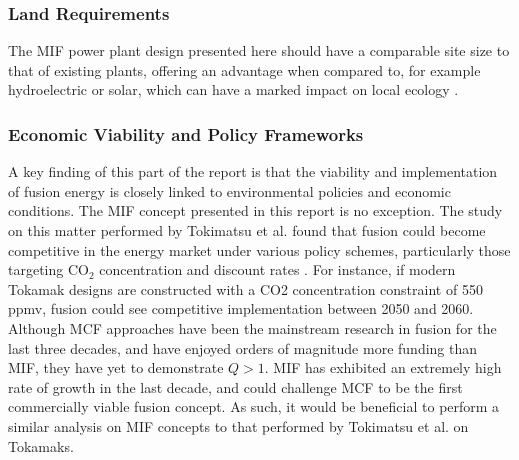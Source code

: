 \subsubsection{Land Requirements}
The MIF power plant design presented here should have a comparable site size to that of existing plants, offering an advantage when compared to, for example hydroelectric or solar, which can have a marked impact on local ecology \cite{fletcher2010environmental}.

\subsubsection{Economic Viability and Policy Frameworks}

A key finding of this part of the report is that the viability and implementation of fusion energy is closely linked to environmental policies and economic conditions. The MIF concept presented in this report is no exception. The study on this matter performed by Tokimatsu et al. found that fusion could become competitive in the energy market under various policy schemes, particularly those targeting CO$_2$ concentration and discount rates \cite{tokimatsu2003role}. For instance, if modern Tokamak designs are constructed with a CO2 concentration constraint of 550 ppmv, fusion could see competitive implementation between 2050 and 2060. Although MCF approaches have been the mainstream research in fusion for the last three decades, and have enjoyed orders of magnitude more funding than MIF,  they have yet to demonstrate $Q > 1$. MIF has exhibited an extremely high rate of growth in the last decade, and could challenge MCF to be the first commercially viable fusion concept. As such, it would be beneficial to perform a similar analysis on MIF concepts to that performed by Tokimatsu et al. on Tokamaks.
